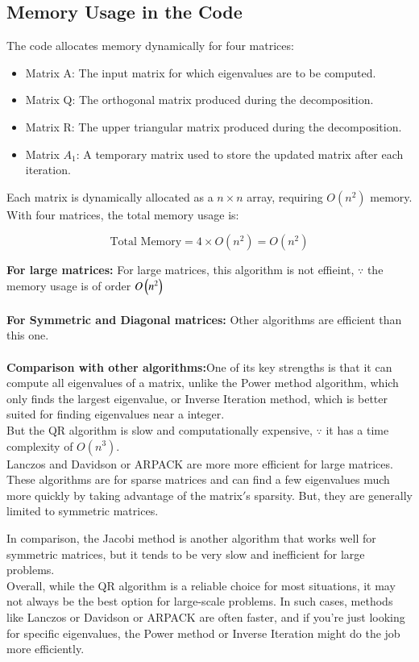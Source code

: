 \documentclass[journal,20pt,onecolumn]{IEEEtran}
\theoremstyle{remark}
\begin{document}
\subsection{Memory Usage in the Code}
The code allocates memory dynamically for four matrices:
\begin{itemize}
    \item Matrix  A: The input matrix for which eigenvalues are to be computed.
    \item Matrix  Q: The orthogonal matrix produced during the decomposition.
    \item Matrix  R: The upper triangular matrix produced during the decomposition.
    \item Matrix  $A_1$: A temporary matrix used to store the updated matrix after each iteration.
\end{itemize}

Each matrix is dynamically allocated as a \( n \times n \) array, requiring \( O(n^2) \) memory. With four matrices, the total memory usage is:

$$
\text{Total Memory} = 4 \times O(n^2) = O(n^2)
$$

\textbf{For large matrices:} For large matrices, this algorithm is not effieint, $\because$ the memory usage is of order $O\left(n^2\right)$\\ \\
     \textbf{For Symmetric and Diagonal matrices:} Other algorithms are efficient than this one.\\ \\
 \textbf{Comparison with other algorithms:}One of its key strengths is that it can compute all eigenvalues of a matrix, unlike the Power method algorithm, which only finds the largest eigenvalue, or Inverse Iteration method, which is better suited for finding eigenvalues near a integer.\\ 
      But the QR algorithm is slow and computationally expensive, $\because$ it has a time complexity of $O(n^3).$\\

Lanczos and Davidson or ARPACK are more more efficient for large matrices. These algorithms are for sparse matrices and can find a few eigenvalues much more quickly by taking advantage of the matrix$'$s sparsity. But, they are generally limited to symmetric matrices.

In comparison, the Jacobi method is another algorithm that works well for symmetric matrices, but it tends to be very slow and inefficient for large problems. \\Overall, while the QR algorithm is a reliable choice for most situations, it may not always be the best option for large-scale problems. In such cases, methods like Lanczos or Davidson or ARPACK are often faster, and if you're just looking for specific eigenvalues, the Power method or Inverse Iteration might do the job more efficiently. 
\end{document}
